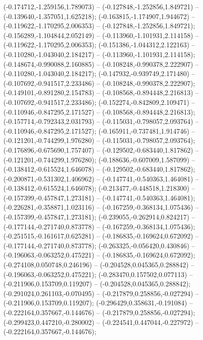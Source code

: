  (-0.174712,-1.259156,1.789073) -- (-0.127848,-1.252856,1.849721) -- (-0.139640,-1.357051,1.625218);
 (-0.163815,-1.174907,1.944672) -- (-0.119622,-1.170295,2.006353) -- (-0.127848,-1.252856,1.849721);
 (-0.156289,-1.104844,2.052149) -- (-0.113960,-1.101931,2.114158) -- (-0.119622,-1.170295,2.006353);
 (-0.151386,-1.044312,2.122163) -- (-0.110280,-1.043040,2.184217) -- (-0.113960,-1.101931,2.114158);
 (-0.148674,-0.990088,2.160885) -- (-0.108248,-0.990378,2.222907) -- (-0.110280,-1.043040,2.184217);
 (-0.147932,-0.939749,2.171480) -- (-0.107692,-0.941517,2.233486) -- (-0.108248,-0.990378,2.222907);
 (-0.149101,-0.891280,2.154783) -- (-0.108568,-0.894448,2.216813) -- (-0.107692,-0.941517,2.233486);
 (-0.152274,-0.842809,2.109471) -- (-0.110946,-0.847295,2.171527) -- (-0.108568,-0.894448,2.216813);
 (-0.157714,-0.792343,2.031793) -- (-0.115031,-0.798057,2.093764) -- (-0.110946,-0.847295,2.171527);
 (-0.165911,-0.737481,1.914746) -- (-0.121201,-0.744299,1.976280) -- (-0.115031,-0.798057,2.093764);
 (-0.176896,-0.675690,1.757407) -- (-0.129502,-0.683440,1.817862) -- (-0.121201,-0.744299,1.976280);
 (-0.188636,-0.607009,1.587099) -- (-0.138412,-0.615524,1.646078) -- (-0.129502,-0.683440,1.817862);
 (-0.200871,-0.531302,1.406962) -- (-0.147741,-0.540363,1.464081) -- (-0.138412,-0.615524,1.646078);
 (-0.213477,-0.448518,1.218300) -- (-0.157399,-0.457847,1.273181) -- (-0.147741,-0.540363,1.464081);
 (-0.226281,-0.358871,1.023116) -- (-0.167259,-0.368134,1.075436) -- (-0.157399,-0.457847,1.273181);
 (-0.239055,-0.262914,0.824217) -- (-0.177144,-0.271740,0.873778) -- (-0.167259,-0.368134,1.075436);
 (-0.251515,-0.161617,0.625281) -- (-0.186835,-0.169624,0.672092) -- (-0.177144,-0.271740,0.873778);
 (-0.263325,-0.056420,0.430846) -- (-0.196063,-0.063252,0.475221) -- (-0.186835,-0.169624,0.672092);
 (-0.274108,0.050748,0.246196) -- (-0.204528,0.045365,0.288842) -- (-0.196063,-0.063252,0.475221);
 (-0.283470,0.157502,0.077113) -- (-0.211906,0.153709,0.119207) -- (-0.204528,0.045365,0.288842);
 (-0.291024,0.261103,-0.070495) -- (-0.217879,0.258856,-0.027294) -- (-0.211906,0.153709,0.119207);
 (-0.296429,0.358631,-0.191084) -- (-0.222164,0.357667,-0.144676) -- (-0.217879,0.258856,-0.027294);
 (-0.299423,0.447210,-0.280002) -- (-0.224541,0.447044,-0.227972) -- (-0.222164,0.357667,-0.144676);
